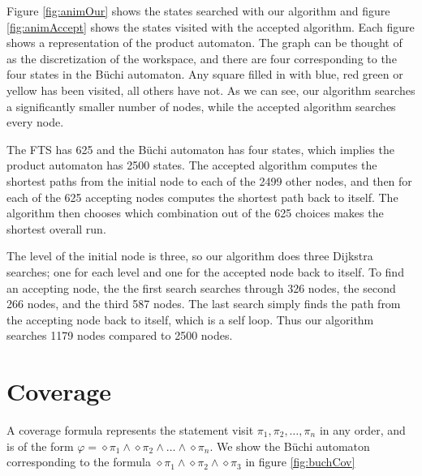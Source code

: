 Figure \ref{fig:animOur} shows the states searched with our algorithm and figure \ref{fig:animAccept} shows the states visited with the accepted algorithm. Each figure shows a representation of the product automaton. The graph can be thought of as the discretization of the workspace, and there are four corresponding to the four states in the B\"uchi automaton. Any square filled in with blue, red green or yellow has been visited, all others have not. As we can see, our algorithm searches a significantly smaller number of nodes, while the accepted algorithm searches every node.

The FTS has 625 and the B\"uchi automaton has four states, which implies the product automaton has 2500 states. The accepted algorithm computes the shortest paths from the initial node to each of the 2499 other nodes, and then for each of the 625 accepting nodes computes the shortest path back to itself. The algorithm then chooses which combination out of the 625 choices makes the shortest overall run. 

The level of the initial node is three, so our algorithm does three Dijkstra searches; one for each level and one for the accepted node back to itself. To find an accepting node, the the first search searches through 326 nodes, the second 266 nodes, and the third 587 nodes. The last search simply finds the path from the accepting node back to itself, which is a self loop. Thus our algorithm searches 1179 nodes compared to 2500 nodes.  



\section{Coverage}
A coverage formula represents the statement visit $\pi_1, \pi_2, \dots, \pi_n$ in any order, and is of the form $\varphi = \diamond \pi_1 \wedge \diamond \pi_2 \wedge \dots \wedge \diamond \pi_n$. We show the B\"uchi automaton corresponding to the formula $\diamond \pi_1 \wedge \diamond \pi_2 \wedge \diamond \pi_3$ in figure \ref{fig:buchCov}

